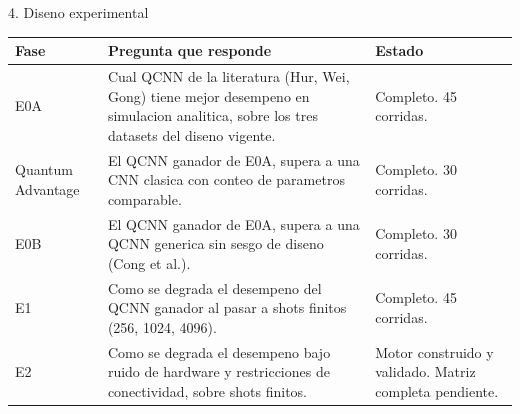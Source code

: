 \documentclass[aspectratio=169]{beamer}
\newcommand{\bandedtable}{\rowcolors{2}{white}{bmRowAlt}}
\begin{document}
\begin{frame}{4. Diseno experimental}
  \footnotesize
  \bandedtable
  \begin{tabular}{@{}p{2.1cm}p{6.6cm}p{3.1cm}@{}}
    \toprule
    \textbf{Fase} & \textbf{Pregunta que responde} & \textbf{Estado} \\
    \midrule
    E0A & Cual QCNN de la literatura (Hur, Wei, Gong) tiene mejor desempeno en
          simulacion analitica, sobre los tres datasets del diseno vigente. &
          Completo. 45 corridas. \\
    Quantum Advantage & El QCNN ganador de E0A, supera a una CNN clasica con conteo
          de parametros comparable. & Completo. 30 corridas. \\
    E0B & El QCNN ganador de E0A, supera a una QCNN generica sin sesgo de diseno
          (Cong et al.). & Completo. 30 corridas. \\
    E1 & Como se degrada el desempeno del QCNN ganador al pasar a shots finitos
          (256, 1024, 4096). & Completo. 45 corridas. \\
    E2 & Como se degrada el desempeno bajo ruido de hardware y restricciones de
          conectividad, sobre shots finitos. & Motor construido y validado.
          Matriz completa pendiente. \\
    \bottomrule
  \end{tabular}
\end{frame}
\end{document}
